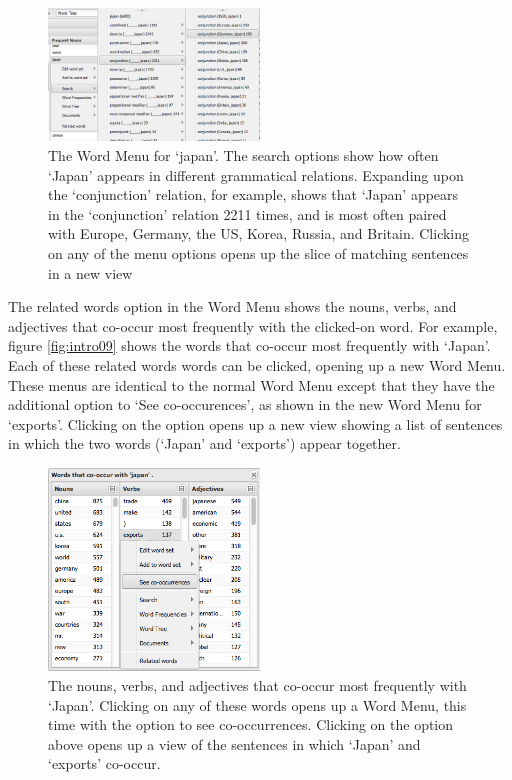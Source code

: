 \documentclass{sig-alternate}
\begin{document}
\begin{figure}[ht!]
\begin{center}
	\includegraphics[width=0.5\textwidth]{fig/intro/08.png}
\end{center}
    \caption{%
      The Word Menu for `japan'.  The search options show how often `Japan' appears in different grammatical relations. Expanding upon the `conjunction' relation, for example, shows that `Japan' appears in the  `conjunction' relation  2211 times, and is most often paired with Europe, Germany, the US, Korea, Russia, and Britain. Clicking on any of the menu options opens up the slice of matching sentences in a new view \label{fig:intro08}}%
\end{figure}

The related words option in the Word Menu shows the nouns, verbs, and adjectives that co-occur most frequently with the clicked-on word. For example, figure \ref{fig:intro09} shows the words that co-occur most frequently with `Japan'. Each of these related words words can be clicked, opening up a new Word Menu. These menus are identical to the normal Word Menu except that they have the additional option to `See co-occurences', as shown in the new Word Menu for `exports'. Clicking on the option opens up a new view showing a list of sentences in which the two words (`Japan' and `exports') appear together.

\begin{figure}[ht!]
\begin{center}
	\includegraphics[width=0.5\textwidth]{fig/intro/09.png}
\end{center}
    \caption{%
 		The nouns, verbs, and adjectives that co-occur most frequently with `Japan'. Clicking on any of these words opens up a Word Menu, this time with the option to see co-occurrences.  Clicking on the option  above opens up a view of the sentences in which `Japan' and `exports'  co-occur.
	}%
\end{figure}
\end{document}
